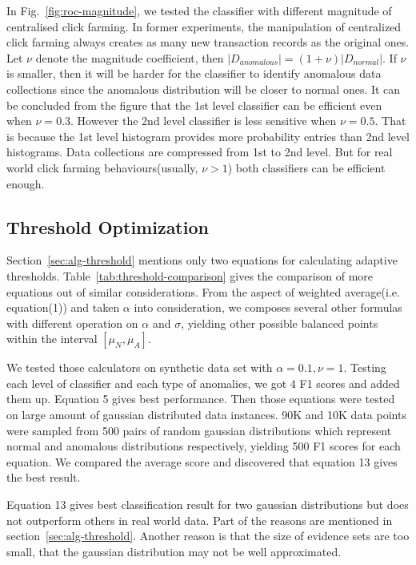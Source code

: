\documentclass[a4paper]{IEEEtran}
\begin{document}
			In Fig.~\ref{fig:roc-magnitude}, we tested the classifier with different magnitude of centralised click farming. In former experiments, the manipulation of centralized click farming always creates as many new transaction records as the original ones. Let $\nu$ denote the magnitude coefficient, then $|D_{anomalous}| = (1 + \nu) |D_{normal}|$. If $\nu $ is smaller, then it will be harder for the classifier to identify anomalous data collections since the anomalous distribution will be closer to normal ones. It can be concluded from the figure that the 1st level classifier can be efficient even when $\nu = 0.3$. However the 2nd level classifier is less sensitive when $\nu = 0.5$. That is because the 1st level histogram provides more probability entries than 2nd level histograms. Data collections are compressed from 1st to 2nd level. But for real world click farming behaviours(usually, $\nu > 1$) both classifiers can be efficient enough.
			
		\subsection{Threshold Optimization}\label{sec:exp-threshold}
			Section~\ref{sec:alg-threshold} mentions only two equations for calculating adaptive thresholds. Table~\ref{tab:threshold-comparison} gives the comparison of more equations out of similar considerations. From the aspect of weighted average(i.e. equation(1)) and taken $\alpha$ into consideration, we composes several other formulas with different operation on $\alpha$ and $\sigma$, yielding other possible balanced points within the interval $[\mu_N, \mu_A]$.
			
			 We tested those calculators on synthetic data set with $\alpha = 0.1, \nu = 1$. Testing each level of classifier and each type of anomalies, we got 4 F1 scores and added them up. Equation 5 gives best performance. Then those equations were tested on large amount of gaussian distributed data instances. 90K and 10K data points were sampled from 500 pairs of random gaussian distributions which represent normal and anomalous distributions respectively, yielding 500 F1 scores for each equation. We compared the average score and discovered that equation 13 gives the best result.
			
			Equation 13 gives best classification result for two gaussian distributions but does not outperform others in real world data. Part of the reasons are mentioned in section~\ref{sec:alg-threshold}. Another reason is that the size of evidence sets are too small, that the gaussian distribution may not be well approximated.
			
\end{document}
